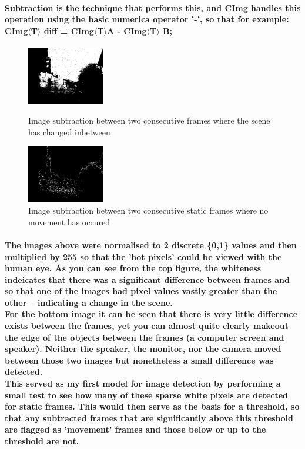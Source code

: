\documentclass[11pt]{article} %
\begin{document}
\paragraph{Subtraction is the technique that performs this, and CImg handles this operation using the basic numerica operator '-', so that for example: CImg\(\langle\)T\(\rangle\) diff = CImg\(\langle\)T\(\rangle\)A - CImg\(\langle\)T\(\rangle\) B;
}
\begin{figure}
	\vspace{-20pt}
	\begin{center}
		\includegraphics[width=0.3\textwidth]{../images/subG}
	\end{center}
	\vspace{-20pt}
	\caption{Image subtraction between two consecutive frames where the scene has changed inbetween}
	\vspace{10pt}
	\begin{center}
		\includegraphics[width=0.3\textwidth]{../images/subF}
	\end{center}
	\vspace{-20pt}
	\caption{Image subtraction between two consecutive static frames where no movement has occured}
\end{figure}
\paragraph{The images above were normalised to 2 discrete \{0,1\} values and then multiplied by 255 so that the 'hot pixels' could be viewed with the human eye. As you can see from the top figure, the whiteness indeicates that there was a significant difference between frames and so that one of the images had pixel values vastly greater than the other -- indicating a change in the scene.
\\For the bottom image it can be seen that there is very little difference exists between the frames, yet you can almost quite clearly makeout the edge of the objects between the frames (a computer screen and speaker). Neither the speaker, the monitor, nor the camera moved between those two images but nonetheless a small difference was detected.\\
This served as my first model for image detection by performing a small test to see how many of these sparse white pixels are detected for static frames. This would then serve as the basis for a threshold, so that any subtracted frames that are significantly above this threshold are flagged as 'movement' frames and those below or up to the threshold 
are not.}
\pagebreak
\end{document}
